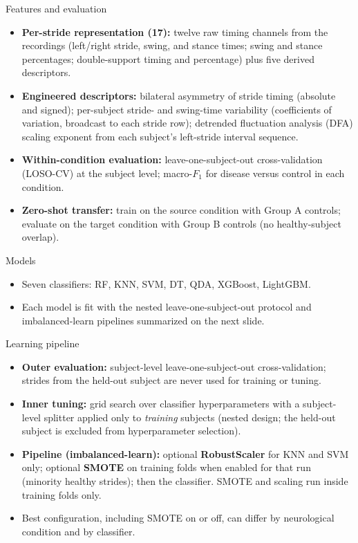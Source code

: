 \documentclass[aspectratio=43,10pt]{beamer}
\begin{document}
\begin{frame}{Features and evaluation}
  \begin{itemize}
    \item {\footnotesize \textbf{Per-stride representation (17):} twelve raw timing channels from the recordings (left/right stride, swing, and stance times; swing and stance percentages; double-support timing and percentage) plus five derived descriptors.}
    \item {\footnotesize \textbf{Engineered descriptors:} bilateral asymmetry of stride timing (absolute and signed); per-subject stride- and swing-time variability (coefficients of variation, broadcast to each stride row); detrended fluctuation analysis (DFA) scaling exponent from each subject's left-stride interval sequence.}
    \item \textbf{Within-condition evaluation:} leave-one-subject-out cross-validation (LOSO-CV) at the subject level; macro-$F_1$ for disease versus control in each condition.
    \item \textbf{Zero-shot transfer:} train on the source condition with Group A controls; evaluate on the target condition with Group B controls (no healthy-subject overlap).
  \end{itemize}
\end{frame}

\begin{frame}{Models}
  \begin{itemize}
    \item Seven classifiers: RF, KNN, SVM, DT, QDA, XGBoost, LightGBM.
    \item Each model is fit with the nested leave-one-subject-out protocol and imbalanced-learn pipelines summarized on the next slide.
  \end{itemize}
\end{frame}

\begin{frame}{Learning pipeline}
  \begin{itemize}
    \item \textbf{Outer evaluation:} subject-level leave-one-subject-out cross-validation; strides from the held-out subject are never used for training or tuning.
    \item \textbf{Inner tuning:} grid search over classifier hyperparameters with a subject-level splitter applied only to \emph{training} subjects (nested design; the held-out subject is excluded from hyperparameter selection).
    \item \textbf{Pipeline (imbalanced-learn):} optional \textbf{RobustScaler} for KNN and SVM only; optional \textbf{SMOTE} on training folds when enabled for that run (minority healthy strides); then the classifier. SMOTE and scaling run inside training folds only.
    \item Best configuration, including SMOTE on or off, can differ by neurological condition and by classifier.
  \end{itemize}
\end{frame}
\end{document}
